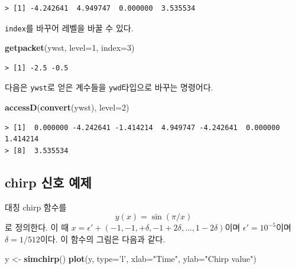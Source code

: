 \documentclass[b5paper,]{scrbook}
\makeatletter
\newenvironment{Shaded}{\begin{snugshade}}{\end{snugshade}}
\newcommand{\KeywordTok}[1]{\textcolor[rgb]{0.13,0.29,0.53}{\textbf{#1}}}
\newcommand{\DataTypeTok}[1]{\textcolor[rgb]{0.13,0.29,0.53}{#1}}
\newcommand{\DecValTok}[1]{\textcolor[rgb]{0.00,0.00,0.81}{#1}}
\newcommand{\StringTok}[1]{\textcolor[rgb]{0.31,0.60,0.02}{#1}}
\newcommand{\NormalTok}[1]{#1}
\theoremstyle{plain}
\theoremstyle{definition}
\numberwithin{equation}{section}
\newenvironment{kframe}{%
\medskip{}
\setlength{\fboxsep}{.8em}
 \def\at@end@of@kframe{}%
 \ifinner\ifhmode%
  \def\at@end@of@kframe{\end{minipage}}%
  \begin{minipage}{\columnwidth}%
 \fi\fi%
 \def\FrameCommand##1{\hskip\@totalleftmargin \hskip-\fboxsep
 \colorbox{shadecolor}{##1}\hskip-\fboxsep
     \hskip-\linewidth \hskip-\@totalleftmargin \hskip\columnwidth}%
 \MakeFramed {\advance\hsize-\width
   \@totalleftmargin\z@ \linewidth\hsize
   \@setminipage}}%
 {\par\unskip\endMakeFramed%
 \at@end@of@kframe}
\renewenvironment{Shaded}{\begin{kframe}}{\end{kframe}}
\makeatother
\begin{document}
\begin{verbatim}
> [1] -4.242641  4.949747  0.000000  3.535534
\end{verbatim}

\texttt{index}를 바꾸어 레벨을 바꿀 수 있다.

\begin{Shaded}
\begin{Highlighting}[]
\KeywordTok{getpacket}\NormalTok{(ywst, }\DataTypeTok{level=}\DecValTok{1}\NormalTok{, }\DataTypeTok{index=}\DecValTok{3}\NormalTok{)}
\end{Highlighting}
\end{Shaded}

\begin{verbatim}
> [1] -2.5 -0.5
\end{verbatim}

다음은 \texttt{ywst}로 얻은 계수들을 \texttt{ywd}타입으로 바꾸는
명령어다.

\begin{Shaded}
\begin{Highlighting}[]
\KeywordTok{accessD}\NormalTok{(}\KeywordTok{convert}\NormalTok{(ywst), }\DataTypeTok{level=}\DecValTok{2}\NormalTok{)}
\end{Highlighting}
\end{Shaded}

\begin{verbatim}
> [1]  0.000000 -4.242641 -1.414214  4.949747 -4.242641  0.000000  1.414214
> [8]  3.535534
\end{verbatim}

\subsection{chirp 신호 예제}\label{chirp--}

대칭 chirp 함수를 \[y(x)=\sin(\pi/x)\] 로 정의한다. 이 때
\(x=\epsilon ' +(-1,-1,+\delta,-1+2\delta, \ldots, 1-2\delta)\)이며
\(\epsilon ' =10^{-5}\)이며 \(\delta=1/512\)이다. 이 함수의 그림은
다음과 같다.

\begin{Shaded}
\begin{Highlighting}[]
\NormalTok{y <-}\StringTok{ }\KeywordTok{simchirp}\NormalTok{()}
\KeywordTok{plot}\NormalTok{(y, }\DataTypeTok{type=}\StringTok{'l'}\NormalTok{, }\DataTypeTok{xlab=}\StringTok{"Time"}\NormalTok{, }\DataTypeTok{ylab=}\StringTok{"Chirp value"}\NormalTok{)}
\end{Highlighting}
\end{Shaded}
\end{document}
